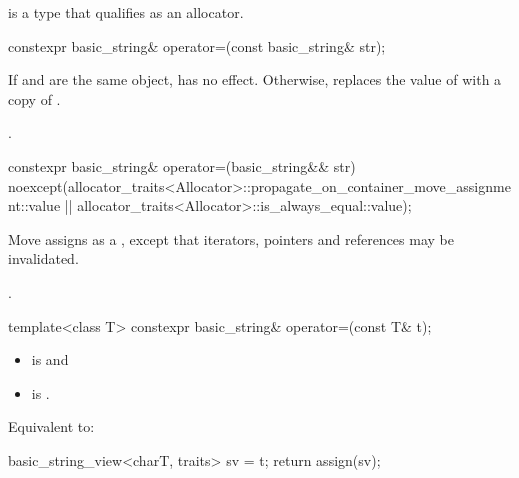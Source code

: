 \begin{itemdescr}
\pnum
\constraints
{} is a type that qualifies as
an allocator.
\end{itemdescr}

%
\begin{itemdecl}
constexpr basic_string& operator=(const basic_string& str);
\end{itemdecl}

\begin{itemdescr}
\pnum
\effects
If  and  are the same object, has no effect.
Otherwise, replaces the value of  with a copy of .

\pnum
\returns
{}.
\end{itemdescr}

%
\begin{itemdecl}
constexpr basic_string& operator=(basic_string&& str)
  noexcept(allocator_traits<Allocator>::propagate_on_container_move_assignment::value ||
           allocator_traits<Allocator>::is_always_equal::value);
\end{itemdecl}

\begin{itemdescr}
\pnum
\effects
Move assigns as a ,
except that iterators, pointers and references may be invalidated.

\pnum
\returns
{}.
\end{itemdescr}

%
\begin{itemdecl}
template<class T>
  constexpr basic_string& operator=(const T& t);
\end{itemdecl}

\begin{itemdescr}
\pnum
\constraints
\begin{itemize}
\item {}
is  and
\item {}
is .
\end{itemize}

\pnum
\effects
Equivalent to:
\begin{codeblock}
basic_string_view<charT, traits> sv = t;
return assign(sv);
\end{codeblock}
\end{itemdescr}

